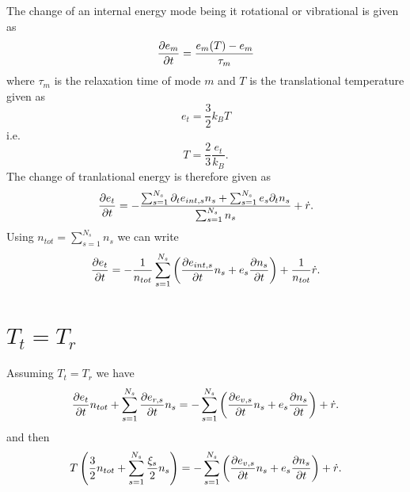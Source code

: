 \documentclass{scrreprt}
\begin{document}
The change of an internal energy mode being it rotational or vibrational is given as
\begin{equation}
	\pdv{e_m}{t} = \frac{e_m(T) - e_m}{\tau_m}
\end{equation}
where $\tau_m$ is the relaxation time of mode $m$ and $T$ is the translational temperature given as
\begin{equation}
	e_t = \frac{3}{2}k_B T
\end{equation}
i.e.
\begin{equation}
	T = \frac{2}{3}\frac{e_t}{k_B}.
\end{equation}
The change of tranlational energy is therefore given as
\begin{equation}
	\pdv{e_t}{t} = -\frac{\sum_{s = 1}^{N_s} \partial_t e_{int, s} n_s + \sum_{s = 1}^{N_s} e_{s} \partial_t n_s}{\sum_{s = 1}^{N_s} n_s} + \dot{r}.
\end{equation}
Using $n_{tot} = \sum_{s = 1}^{N_s} n_s$ we can write
\begin{equation}
	\pdv{e_t}{t} = -\frac{1}{n_{tot}}\sum_{s = 1}^{N_s} \left( \pdv{e_{int, s}}{t} n_s +  e_{s} \pdv{n_s}{t} \right) + \frac{1}{n_{tot}}\dot{r}.
\end{equation}

\section{$T_t = T_r$}
Assuming $T_t = T_r$ we have
\begin{equation}
	\pdv{e_t}{t}n_{tot} + \sum_{s = 1}^{N_s}\pdv{e_{r, s}}{t} n_s = -\sum_{s = 1}^{N_s} \left( \pdv{e_{v, s}}{t} n_s +  e_{s} \pdv{n_s}{t} \right)  + \dot{r}.
\end{equation}
and then
\begin{equation}
	T\left(\frac{3}{2}n_{tot} + \sum_{s = 1}^{N_s}\frac{\xi_s}{2} n_s\right) = -\sum_{s = 1}^{N_s} \left( \pdv{e_{v, s}}{t} n_s +  e_{s} \pdv{n_s}{t} \right)  + \dot{r}.
\end{equation}
\end{document}

